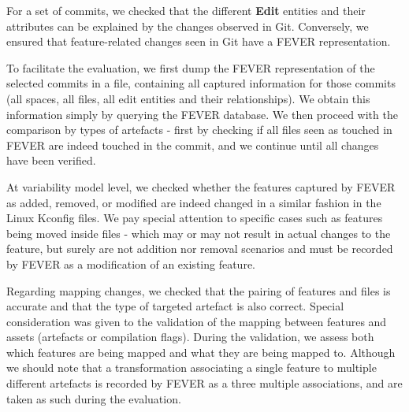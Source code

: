 For a set of commits, we checked that the different \textbf{Edit} entities and their attributes can be explained by the changes observed in Git.
Conversely, we ensured that feature-related changes seen in Git have a FEVER representation.

To facilitate the evaluation, we first dump the FEVER representation of the selected commits in a file, containing all captured 
information for those commits (all spaces, all files, all edit entities and their relationships). 
We obtain this information simply by querying the FEVER database. 
We then proceed with the comparison by types of artefacts - first by checking if all files seen as touched in FEVER are indeed touched in the commit, and we continue until all changes have been verified.

At variability model level, we checked whether the features captured by FEVER as added, removed, or modified are indeed
changed in a similar fashion in the Linux Kconfig files.
We pay special attention to specific cases such as features being moved inside files - which may or may not result in actual changes to the feature,
but surely are not addition nor removal scenarios and must be recorded by FEVER as a modification of an existing feature.

Regarding mapping changes, we checked that the pairing of features and files is accurate and that the type of targeted artefact
is also correct.
Special consideration was given to the validation of the mapping between features and assets (artefacts or compilation flags).
During the validation, we assess both which features are being mapped and what they are being mapped to. 
Although we should note that a transformation associating a single feature to multiple different artefacts is recorded by FEVER
as a three multiple associations, and are taken as such during the evaluation.


